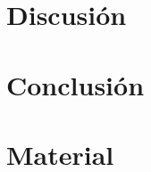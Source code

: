 \documentclass[spanish, a4paper, 12pt, openany,final]{book}
\begin{document}
\chapter{Discusión}
    
\clearpage


\chapter{Conclusión}
    
\clearpage

\newpage
\renewcommand\refname{Referencias}          %
{                           %
}

\newpage
\renewcommand{\appendixpagename}{Apéndices}     %

\appendix   %

\chapter{Material}
\end{document}
